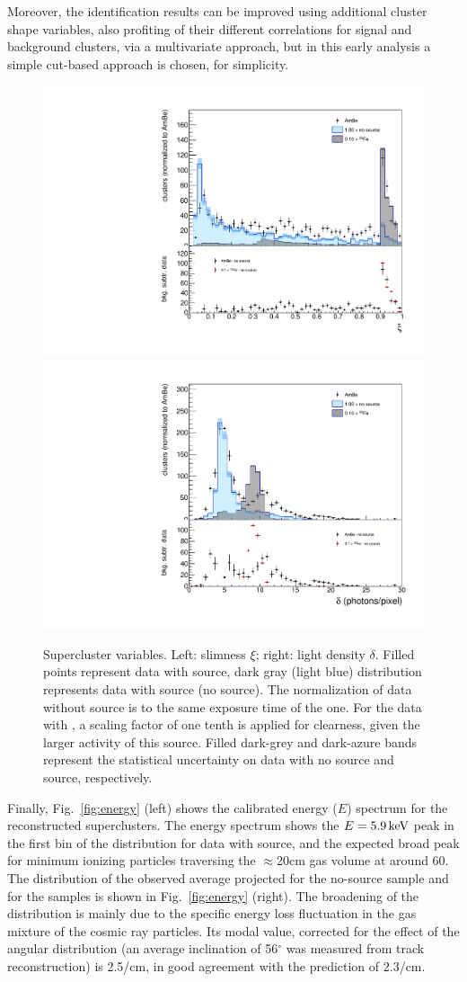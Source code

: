 Moreover, the identification results can be improved using
additional cluster shape variables, also profiting of their different
correlations for signal and background clusters, via a multivariate
approach, but in this early analysis a simple cut-based approach is
chosen, for simplicity.

\begin{figure}[ht]
  \begin{center}
  \includegraphics[width=0.45\linewidth]{figures/slimness}
  \includegraphics[width=0.45\linewidth]{figures/density}

  \caption{Supercluster variables. Left: slimness $\xi$; right: light
    density $\delta$. Filled points represent data with \ambe source,
    dark gray (light blue) distribution represents data with \fe
    source (no source).  The normalization of data without source is
    to the same exposure time of the \ambe one. For the data with \fe,
    a scaling factor of one tenth is applied for clearness, given the
    larger activity of this source. Filled dark-grey and dark-azure
    bands represent the statistical uncertainty on data with no source
    and \fe source, respectively. \label{fig:clshape}}

\end{center}
\end{figure}

Finally, Fig.~\ref{fig:energy} (left) shows the calibrated energy
($E$) spectrum for the reconstructed superclusters. The energy
spectrum shows the $E=5.9\,\textrm{ke\hspace{-.08em}V}$ peak in the first bin of the
distribution for data with \fe source, and the expected broad peak for
minimum ionizing particles traversing the $\approx$20\unit{cm} gas
volume at around 60\keV. The distribution of the observed average
projected \dedl for the no-source sample and for the \ambe samples is
shown in Fig.~\ref{fig:energy} (right). The broadening of the
distribution is mainly due to the specific energy loss fluctuation in
the gas mixture of the cosmic ray particles.  Its modal value,
corrected for the effect of the angular distribution (an average
inclination of 56$^{\circ}$ was measured from track reconstruction) is
2.5\keV/cm, in good agreement with the \garfield prediction of
2.3\keV/cm.

